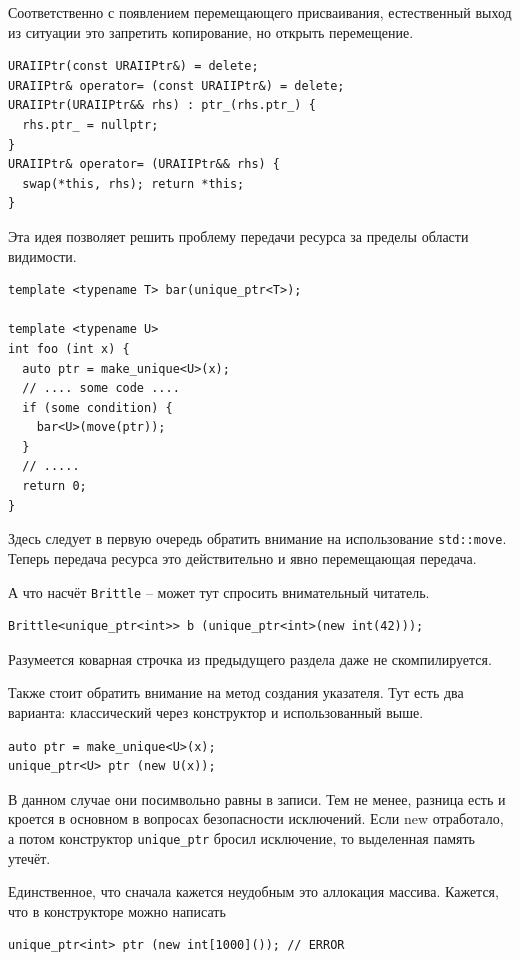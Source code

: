 \documentclass[a4paper,12pt,oneside]{book}
\begin{document}
Соответственно с появлением перемещающего присваивания, естественный выход из ситуации это запретить копирование, но открыть перемещение.

\begin{lstlisting}
URAIIPtr(const URAIIPtr&) = delete;
URAIIPtr& operator= (const URAIIPtr&) = delete;
URAIIPtr(URAIIPtr&& rhs) : ptr_(rhs.ptr_) { 
  rhs.ptr_ = nullptr; 
} 
URAIIPtr& operator= (URAIIPtr&& rhs) { 
  swap(*this, rhs); return *this; 
}
\end{lstlisting}

Эта идея позволяет решить проблему передачи ресурса за пределы области видимости.

\begin{lstlisting}
template <typename T> bar(unique_ptr<T>);

template <typename U>
int foo (int x) {
  auto ptr = make_unique<U>(x);
  // .... some code ....
  if (some condition) {
    bar<U>(move(ptr));
  }
  // .....
  return 0;
}
\end{lstlisting}

Здесь следует в первую очередь обратить внимание на использование \lstinline!std::move!. Теперь передача ресурса это действительно и явно перемещающая передача.

А что насчёт \lstinline!Brittle! -- может тут спросить внимательный читатель.

\begin{lstlisting}
Brittle<unique_ptr<int>> b (unique_ptr<int>(new int(42)));
\end{lstlisting}

Разумеется коварная строчка из предыдущего раздела даже не скомпилируется.

Также стоит обратить внимание на метод создания указателя. Тут есть два варианта: классический через конструктор и использованный выше.

\begin{lstlisting}
auto ptr = make_unique<U>(x);
unique_ptr<U> ptr (new U(x));
\end{lstlisting}

В данном случае они посимвольно равны в записи. Тем не менее, разница есть и кроется в основном в вопросах безопасности исключений. Если new отработало, а потом конструктор \lstinline!unique_ptr! бросил исключение, то выделенная память утечёт.

Единственное, что сначала кажется неудобным это аллокация массива. Кажется, что в конструкторе можно написать

\begin{lstlisting}
unique_ptr<int> ptr (new int[1000]()); // ERROR
\end{lstlisting}
\end{document}
